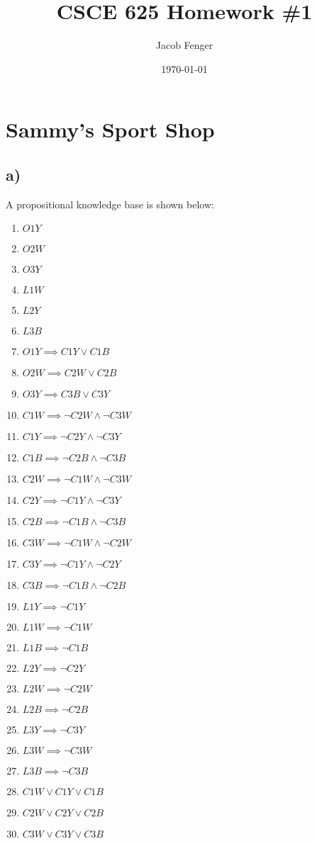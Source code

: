 \documentclass[22pt]{article}
\begin{document}
\title{CSCE 625 Homework \#1}
\author{Jacob Fenger}
\date{\today}
\maketitle

\section{Sammy's Sport Shop}
\subsection*{a)}
A propositional knowledge base is shown below:

\begin{multicols}{2}
\begin{enumerate}
	\item $O1Y$
	\item $O2W$
	\item $O3Y$
	\item $L1W$
	\item $L2Y$
	\item $L3B$
	\item $O1Y \implies C1Y \lor C1B$ 
	\item $O2W \implies C2W \lor C2B$
	\item $O3Y \implies C3B \lor C3Y$
	\item $C1W \implies \neg C2W \land \neg C3W$
	\item $C1Y \implies \neg C2Y \land \neg C3Y$
	\item $C1B \implies \neg C2B \land \neg C3B$
	\item $C2W \implies \neg C1W \land \neg C3W$
	\item $C2Y \implies \neg C1Y \land \neg C3Y$
	\item $C2B \implies \neg C1B \land \neg C3B$
	\item $C3W \implies \neg C1W \land \neg C2W$
	\item $C3Y \implies \neg C1Y \land \neg C2Y$
	\item $C3B \implies \neg C1B \land \neg C2B$
	\item $L1Y \implies \neg C1Y$
	\item $L1W \implies \neg C1W$
	\item $L1B \implies \neg C1B$
	\item $L2Y \implies \neg C2Y$
	\item $L2W \implies \neg C2W$
	\item $L2B \implies \neg C2B$
	\item $L3Y \implies \neg C3Y$
	\item $L3W \implies \neg C3W$
	\item $L3B \implies \neg C3B$
	\item $C1W \lor C1Y \lor C1B$
	\item $C2W \lor C2Y \lor C2B$
	\item $C3W \lor C3Y \lor C3B$
\end{enumerate}
\end{multicols}
\end{document}
